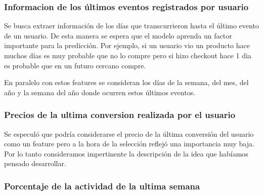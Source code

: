 \documentclass[a4paper]{article}
\begin{document}
\subsubsection{Informacion de los últimos eventos registrados por usuario}

\begin{sloppypar}
	\texttt{}
\end{sloppypar}

Se busca extraer información de los días que transcurrieron hasta el último evento de un usuario. De esta manera se espera que el modelo aprenda un factor importante para la predicción. Por ejemplo, si un usuario vio un producto hace muchos días es muy probable que no lo compre pero si hizo checkout hace 1 dia es probable que en un futuro cercano compre.
	
En paralelo con estos features se consideran los días de la semana, del mes, del año y la semana del año donde ocurren estos últimos eventos.	
	
\subsubsection{Precios de la ultima conversion realizada por el usuario}

\begin{sloppypar}
	\texttt{}
\end{sloppypar}

Se especuló que podría considerarse el precio de la última conversión del usuario como un feature pero a la hora de la selección reflejó una importancia muy baja. Por lo tanto consideramos impertinente la descripción de la idea que habíamos pensado desarrollar.

\subsubsection{Porcentaje de la actividad de la ultima semana}
\end{document}
